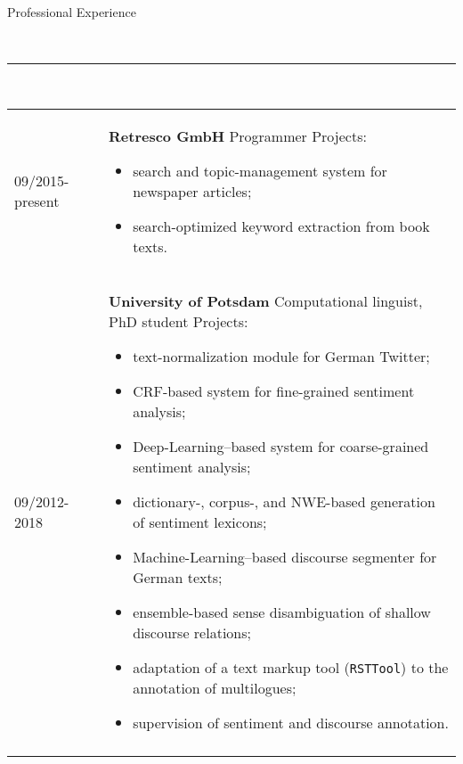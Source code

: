 \documentclass{article}
\newcommand{\cvheader}[1]{\vspace{0.5cm}
  {\raggedright \Large \sc #1}\\\rule[1em]{\textwidth}{0.1mm}}
\newcommand{\cvsection}[2]{\cvheader{#1}\\
  \begin{tabularx}{\textwidth}{p{0.2\textwidth}p{0.8\textwidth}}
    #2\\
  \end{tabularx}
}
\begin{document}
\cvsection{Professional Experience}{
  09/2015-present & \textbf{Retresco GmbH}\newline
  Programmer\newline
  Projects: %
  \begin{itemize}
    \setlength{\topsep}{0pt}
    \setlength{\partopsep}{0pt}
    \setlength{\itemsep}{0pt}
    \setlength{\parsep}{0pt}
  \item search and topic-management system for newspaper articles;
  \item search-optimized keyword extraction from book texts.
  \end{itemize}\\

  09/2012-2018 & \textbf{University of Potsdam}\newline
  Computational linguist, PhD student\newline
  Projects: %
  \begin{itemize}
    \setlength{\topsep}{0pt}
    \setlength{\partopsep}{0pt}
    \setlength{\itemsep}{0pt}
    \setlength{\parsep}{0pt}
  \item text-normalization module for German Twitter;
  \item CRF-based system for fine-grained sentiment analysis;
  \item Deep-Learning--based system for coarse-grained sentiment analysis;
  \item dictionary-, corpus-, and NWE-based generation of sentiment
    lexicons;
  \item Machine-Learning--based discourse segmenter for German texts;
  \item ensemble-based sense disambiguation of shallow discourse
    relations;
  \item adaptation of a text markup tool (\texttt{RSTTool}) to the
    annotation of multilogues;
  \item supervision of sentiment and discourse annotation.
  \end{itemize}\\

}
\end{document}
